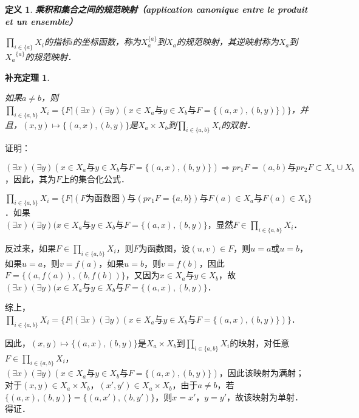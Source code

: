 \documentclass[12pt, a4paper, oneside]{book}
\newtheorem{cor}{补充定理}
\newtheorem{de}{定义}
\begin{document}
			\begin{de}
				\textbf{乘积和集合之间的规范映射（application canonique entre le produit et un ensemble）}
				\par
				$\prod\limits_{i\in \{a\}}X_i$的指标$i$的坐标函数，称为$X_a^{\{a\}}$到$X_a$的规范映射，其逆映射称为$X_a$到${X_a}^{\{a\}}$的规范映射．
			\end{de}
			
			\begin{cor}\label{cor131}
				\hfill\par
				如果$a\neq b$，则$\prod\limits_{i\in \{a, b\}}X_i=\{F|(\exists x)(\exists y)(x\in X_a\text{与}y\in X_b\text{与}F=\{(a, x), (b, y)\})\}$，并且，$(x, y)\mapsto \{(a, x), (b, y)\}$是$X_a\times X_b$到$\prod\limits_{i\in \{a, b\}}X_i$的双射．
			\end{cor}
			证明：
			\par
			$(\exists x)(\exists y)(x\in X_a\text{与}y\in X_b\text{与}F=\{(a, x), (b, y)\})\Rightarrow pr_1F=(a, b)\text{与}pr_2F\subset X_a\cup X_b$，因此，其为$F$上的集合化公式．
			\par
			$\prod\limits_{i\in \{a, b\}}X_i=\{F|(F\text{为函数图})\text{与}(pr_1F=\{a, b\})\text{与}F(a)\in X_a\text{与}F(a)\in X_b\}$．如果\\$(\exists x)(\exists y)(x\in X_a\text{与}y\in X_b\text{与}F=\{(a, x), (b, y)\}$，显然$F\in \prod\limits_{i\in \{a, b\}}X_i$．
			\par
			反过来，如果$F\in \prod\limits_{i\in \{a, b\}}X_i$，则$F$为函数图，设$(u, v)\in F$，则$u=a\text{或}u=b$，如果$u=a$，则$v=f(a)$，如果$u=b$，则$v=f(b)$，因此$F=\{(a, f(a)), (b, f(b))\}$，又因为$x\in X_a\text{与}y\in X_b$，故$(\exists x)(\exists y)(x\in X_a\text{与}y\in X_b\text{与}F=\{(a, x), (b, y)\}$．
			\par
			综上，$\prod\limits_{i\in \{a, b\}}X_i=\{F|(\exists x)(\exists y)(x\in X_a\text{与}y\in X_b\text{与}F=\{(a, x), (b, y)\})\}$．
			\par
			因此，$(x, y)\mapsto \{(a, x), (b, y)\}$是$X_a\times X_b$到$\prod\limits_{i\in \{a, b\}}X_i$的映射，对任意$F\in \prod\limits_{i\in \{a, b\}}X_i$，\\$(\exists x)(\exists y)(x\in X_a\text{与}y\in X_b\text{与}F=\{(a, x), (b, y)\})$，因此该映射为满射；对于$(x, y) \in X_a\times X_b$，$(x', y') \in X_a\times X_b$，由于$a\neq b$，若$\{(a, x), (b, y)\}=\{(a, x'), (b, y')\}$，则$x=x'$，$y=y'$，故该映射为单射．得证．
						
\end{document}
